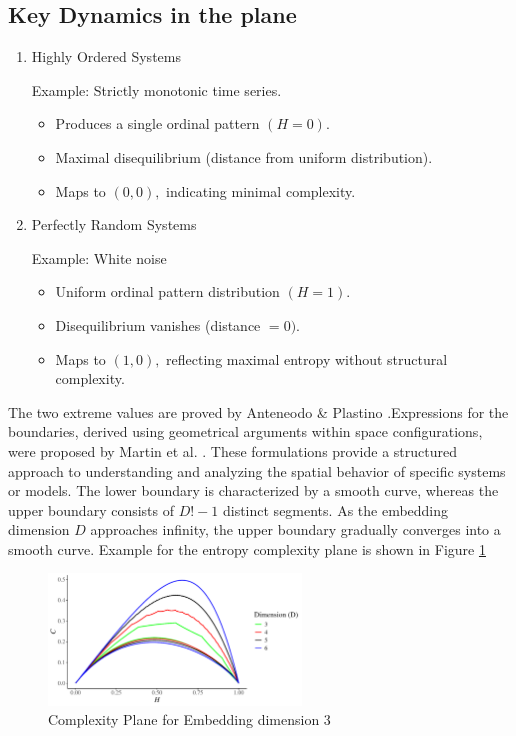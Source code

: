 \subsection{Key Dynamics in the plane}
\begin{enumerate}
	\item Highly Ordered Systems
	
	Example: Strictly monotonic time series.
	\begin{itemize}
		\item Produces a single ordinal pattern $(H=0)$.
		
		\item Maximal disequilibrium (distance from uniform distribution).
		
		\item Maps to $(0,0),$ indicating minimal complexity.
	\end{itemize}
	
	\item Perfectly Random Systems
	
	Example: White noise
	\begin{itemize}
		\item Uniform ordinal pattern distribution $(H=1)$.
		\item Disequilibrium vanishes (distance $=0)$.
		\item Maps to $(1,0),$ reflecting maximal entropy without structural complexity.
	\end{itemize}
\end{enumerate}
The two extreme values are proved by Anteneodo \& Plastino \cite{anteneodo1996some}.Expressions for the boundaries, derived using geometrical arguments within space configurations, were proposed by Martin et al. \cite{Martin2006}. These formulations provide a structured approach to understanding and analyzing the spatial behavior of specific systems or models. The lower boundary is characterized by a smooth curve, whereas the upper boundary consists of $D!-1$ distinct segments. As the embedding dimension $D$ approaches infinity, the upper boundary gradually converges into a smooth curve. 
Example for the entropy complexity plane is shown in Figure \ref{fig:complexity}

\begin{figure}[hbt]
	\centering
	\includegraphics[width=0.6\textwidth]{complexity plane}
	\caption{Complexity Plane for Embedding dimension 3}
	\label{fig:complexity}
\end{figure}

